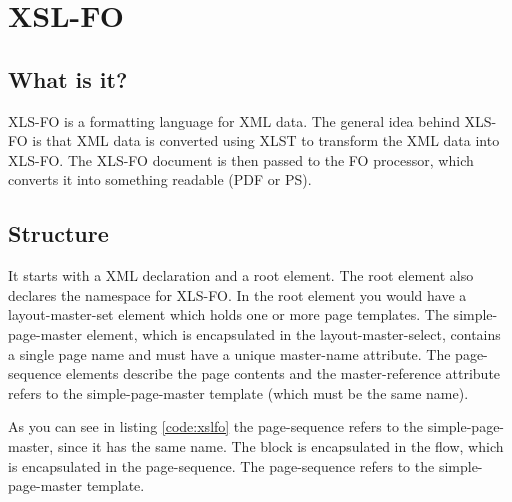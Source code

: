 \chapter{XSL-FO}
\label{chap:xsl-fo}

\section{What is it?}

XLS-FO \cite{wikixslfo,w3schoolxslfo} is a formatting language for XML data. The general idea behind XLS-FO is that XML data is converted using XLST to transform the XML data into XLS-FO. The XLS-FO document is then passed to the FO processor, which converts it into something readable (PDF or PS). 

\section{Structure}

It starts with a XML declaration and a root element. The root element also declares the namespace for XLS-FO. In the root element you would have a layout-master-set element which holds one or more page templates. The simple-page-master element, which is encapsulated in the layout-master-select, contains a single page name and must have a unique master-name attribute. The page-sequence elements describe the page contents and the master-reference attribute refers to the simple-page-master template (which must be the same name). 



As you can see in listing \ref{code:xslfo} the page-sequence refers to the simple-page-master, since it has the same name. The block is encapsulated in the flow, which is encapsulated in the page-sequence. The page-sequence refers to the simple-page-master template.